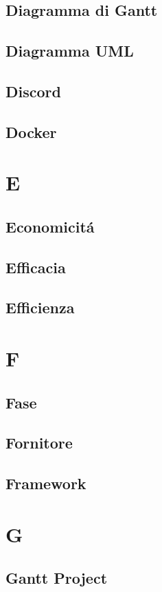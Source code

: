 \documentclass[12pt]{article}
\begin{document}
		\subsection{Diagramma di Gantt}
		\subsection{Diagramma UML}
		\subsection{Discord}
		\subsection{Docker}
	\clearpage
	\section{E}
		\subsection{Economicit\'a}
		\subsection{Efficacia}
		\subsection{Efficienza}
	\clearpage
	\section{F}
		\subsection{Fase}
		\subsection{Fornitore}
		\subsection{Framework} %
	\clearpage
	\section{G}
		\subsection{Gantt Project}
\end{document}
